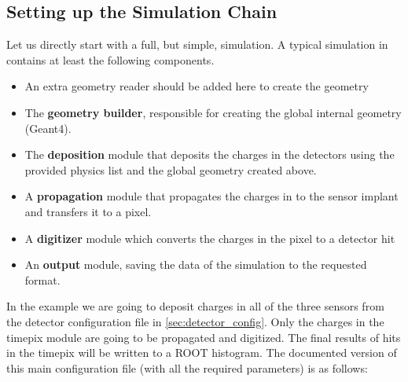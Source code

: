 \subsection{Setting up the Simulation Chain}
Let us directly start with a full, but simple, simulation. A typical simulation in \apsq contains at least the following components.
\begin{itemize}
\item \todo An extra geometry reader should be added here to create the \apsq geometry \todo
\item The \textbf{geometry builder}, responsible for creating the global internal geometry (Geant4).
\item The \textbf{deposition} module that deposits the charges in the detectors using the provided physics list and the global geometry created above.
\item A \textbf{propagation} module that propagates the charges in to the sensor implant and transfers it to a pixel.
\item A \textbf{digitizer} module which converts the charges in the pixel to a detector hit
\item An \textbf{output} module, saving the data of the simulation to the requested format.
\end{itemize}
In the example we are going to deposit charges in all of the three sensors from the detector configuration file in \ref{sec:detector_config}. Only the charges in the timepix module are going to be propagated and digitized. The final results of hits in the timepix will be written to a ROOT histogram. The documented version of this main configuration file (with all the required parameters) is as follows:
